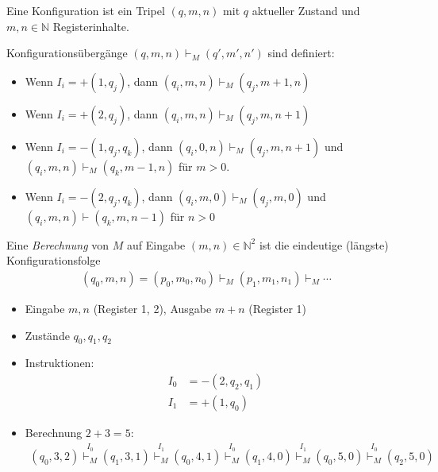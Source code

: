 \begin{definition}[2-Registermaschinenberechnung]
    Eine Konfiguration ist ein Tripel $(q, m, n)$ mit $q$ aktueller Zustand und $m, n \in \mathbb{N}$ Registerinhalte.

    Konfigurationsübergänge $(q, m, n) \vdash_M (q', m', n')$ sind definiert:
    \begin{itemize}
        \item Wenn $I_i = +(1, q_j)$, dann $(q_i, m, n) \vdash_M (q_j, m + 1, n)$
        \item Wenn $I_i = +(2, q_j)$, dann $(q_i, m, n) \vdash_M (q_j, m, n + 1)$
        \item Wenn $I_i = -(1, q_j, q_k)$, dann $(q_i, 0, n) \vdash_M (q_j, m, n + 1)$ und $(q_i, m, n) \vdash_M (q_k, m - 1, n)$ für $m > 0$.
        \item Wenn $I_i = -(2, q_j, q_k)$, dann $(q_i, m, 0) \vdash_M (q_j, m, 0)$ und $(q_i, m, n) \vdash (q_k, m, n - 1)$ für $n > 0$
    \end{itemize}
    Eine \emph{Berechnung} von $M$ auf Eingabe  $(m, n) \in \mathbb{N}^2$ ist die eindeutige (längste) Konfigurationsfolge
    \begin{gather*}
    (q_0, m, n) = (p_0, m_0, n_0) \vdash_M (p_1, m_1, n_1) \vdash_M \cdots
    \end{gather*}
\end{definition}


\begin{tafel}\mbox{}
    \begin{itemize}
        \item Eingabe $m, n$ (Register 1, 2), Ausgabe $m + n$ (Register 1)
        \item Zustände $q_0, q_1, q_2$
        \item Instruktionen: \begin{align*}
                I_0 &= -(2, q_2, q_1)\\
                I_1 &= +(1, q_0)
            \end{align*}
        \item Berechnung $2 + 3 = 5$: \begin{align*}
                (q_0, 3, 2)
                \stackrel{I_0}{\vdash_M} (q_1, 3, 1)
                \stackrel{I_1}{\vdash_M} (q_0, 4, 1)
                \stackrel{I_0}{\vdash_M} (q_1, 4, 0)
                \stackrel{I_1}{\vdash_M} (q_0, 5, 0)
                \stackrel{I_0}{\vdash_M} (q_2, 5, 0)
            \end{align*}
    \end{itemize}

\end{tafel}

